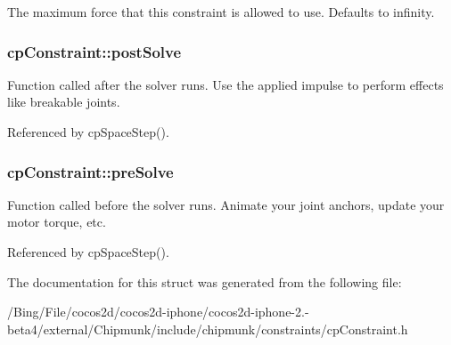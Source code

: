 The maximum force that this constraint is allowed to use. Defaults to infinity. \hypertarget{structcp_constraint_a1be309feb59902e01cfcaeb5f6696930}{
\subsubsection[{post\-Solve}]{ {\bf cp\-Constraint\-::post\-Solve}}}\label{structcp_constraint_a1be309feb59902e01cfcaeb5f6696930}
Function called after the solver runs. Use the applied impulse to perform effects like breakable joints. 

Referenced by cp\-Space\-Step().

\hypertarget{structcp_constraint_a4a9e75379d50abaf80662cad350324d6}{
\subsubsection[{pre\-Solve}]{ {\bf cp\-Constraint\-::pre\-Solve}}}\label{structcp_constraint_a4a9e75379d50abaf80662cad350324d6}
Function called before the solver runs. Animate your joint anchors, update your motor torque, etc. 

Referenced by cp\-Space\-Step().



The documentation for this struct was generated from the following file\-:\begin{DoxyCompactItemize}
\item 
/\-Bing/\-File/cocos2d/cocos2d-\/iphone/cocos2d-\/iphone-\/2.-\/beta4/external/\-Chipmunk/include/chipmunk/constraints/cp\-Constraint.\-h\end{DoxyCompactItemize}
